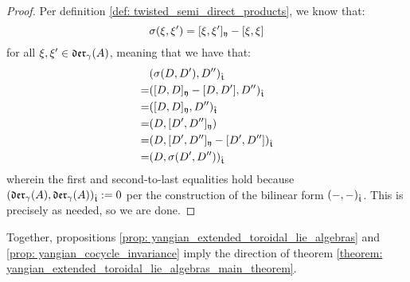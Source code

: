            \begin{proof}
                Per definition \ref{def: twisted_semi_direct_products}, we know that:
                    $$\sigma(\xi, \xi') = [\xi, \xi']_{\mathfrak{y}} - [\xi, \xi]$$
                for all $\xi, \xi' \in \mathfrak{der}_{\gamma}(A)$, meaning that we have that:
                    $$
                        \begin{aligned}
                            & (\sigma(D, D'), D'')_{\hat{\mathfrak{t}}}
                            \\
                            = & ([D, D]_{\mathfrak{y}} - [D, D'], D'')_{\hat{\mathfrak{t}}}
                            \\
                            = & ([D, D]_{\mathfrak{y}}, D'')_{\hat{\mathfrak{t}}} 
                            \\
                            = & (D, [D', D'']_{\mathfrak{y}})
                            \\
                            = & (D, [D', D'']_{\mathfrak{y}} - [D', D''])_{\hat{\mathfrak{t}}}
                            \\
                            = & (D, \sigma(D', D''))_{\hat{\mathfrak{t}}}
                        \end{aligned}
                    $$
                wherein the first and second-to-last equalities hold because $(\mathfrak{der}_{\gamma}(A), \mathfrak{der}_{\gamma}(A))_{\hat{\mathfrak{t}}} := 0$ per the construction of the bilinear form $(-, -)_{\hat{\mathfrak{t}}}$. This is precisely as needed, so we are done.
            \end{proof}

        Together, propositions \ref{prop: yangian_extended_toroidal_lie_algebras} and \ref{prop: yangian_cocycle_invariance} imply the  direction of theorem \ref{theorem: yangian_extended_toroidal_lie_algebras_main_theorem}.
